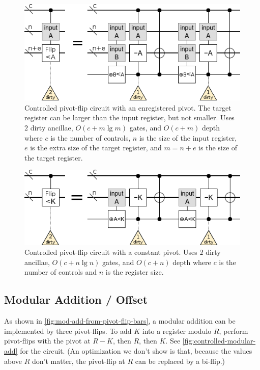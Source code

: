 \documentclass[twocolumn,longbibliography]{quantumarticle-customized}
\begin{document}
\begin{figure}
  \centering
  \includegraphics[width=\linewidth]{assets/controlled-pivot-flip.png}
  \caption{
    Controlled pivot-flip circuit with an enregistered pivot.
    The target register can be larger than the input register, but not smaller.
    Uses $2$ dirty ancillae, $O(c + m \lg m)$ gates, and $O(c + m)$ depth where $c$ is the number of controls, $n$ is the size of the input register, $e$ is the extra size of the target register, and $m=n+e$ is the size of the target register.
  }
  \label{fig:controlled-pivot-flip}
\end{figure}

\begin{figure}
  \centering
  \includegraphics[width=\linewidth]{assets/controlled-const-pivot-flip.png}
  \caption{
    Controlled pivot-flip circuit with a constant pivot.
    Uses $2$ dirty ancillae, $O(c + n \lg n)$ gates, and $O(c + n)$ depth where $c$ is the number of controls and $n$ is the register size.
  }
  \label{fig:controlled-const-pivot-flip}
\end{figure}


\subsection{Modular Addition / Offset}

As shown in \autoref{fig:mod-add-from-pivot-flip-bars}, a modular addition can be implemented by three pivot-flips.
To add $K$ into a register modulo $R$, perform pivot-flips with the pivot at $R-K$, then $R$, then $K$.
See \autoref{fig:controlled-modular-add} for the circuit.
(An optimization we don't show is that, because the values above $R$ don't matter, the pivot-flip at $R$ can be replaced by a bi-flip.)
\end{document}
